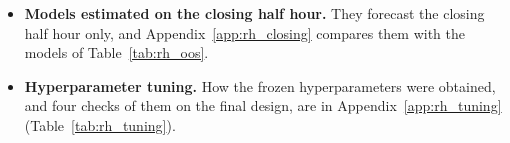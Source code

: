 \begin{itemize}
\item \textbf{Models estimated on the closing half hour.} They forecast the closing half hour only, and
  Appendix~\ref{app:rh_closing} compares them with the models of Table~\ref{tab:rh_oos}.
\item \textbf{Hyperparameter tuning.} How the frozen hyperparameters were obtained, and four checks of them on the
  final design, are in Appendix~\ref{app:rh_tuning} (Table~\ref{tab:rh_tuning}).
\end{itemize}



